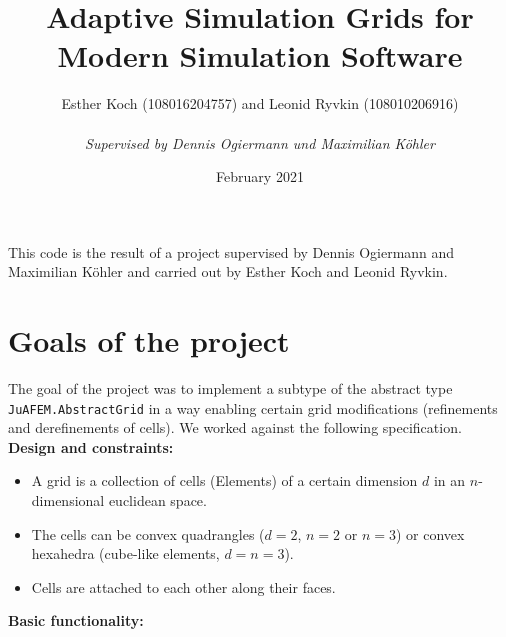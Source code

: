 \documentclass{article}
\title{Adaptive Simulation Grids for Modern Simulation Software}
\author{Esther Koch (108016204757) and Leonid Ryvkin (108010206916)\\ ~\\ \textit{Supervised by Dennis Ogiermann und Maximilian Köhler}}
\date{February 2021}
\begin{document}
This code is the result of a project supervised by Dennis Ogiermann and Maximilian Köhler and carried out by Esther Koch and Leonid Ryvkin. 


\section{Goals of the project}
The goal of the project was to implement a subtype of the abstract type \texttt{JuAFEM.AbstractGrid} in a way enabling certain grid modifications (refinements and derefinements of cells). We worked against the following specification.\\

{\bf Design and constraints:}

\begin{itemize}
 \item A grid is a collection of cells (Elements) of a certain dimension $d$ in an $n$-dimensional euclidean space. 
 \item The cells can be convex quadrangles ($d=2$, $n=2$ or $n=3$) or convex hexahedra (cube-like elements, $d=n=3$).
 \item Cells are attached to each other along their faces.
 \end{itemize}
 

 {\bf Basic functionality:}
 
\end{document}
